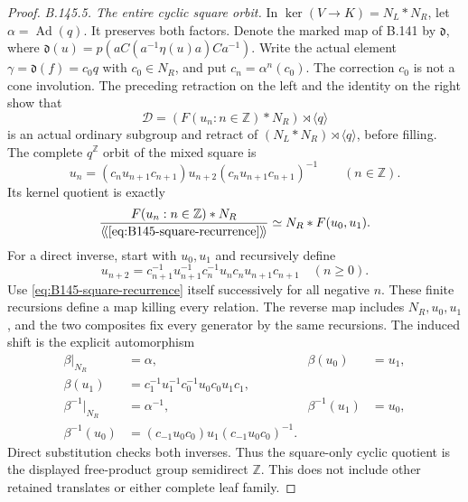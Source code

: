 \begin{proof}
\emph{B.145.5. The entire cyclic square orbit.}
In $\ker(V\to K)=N_L*N_R$, let $\alpha=\operatorname{Ad}(q)$.
It preserves both factors. Denote the marked map of B.141 by
$\mathfrak d$, where
$\mathfrak d(u)=p(aC(a^{-1}\eta(u)a)Ca^{-1})$.
Write the actual element
$\gamma=\mathfrak d(f)=c_0q$ with $c_0\in N_R$, and put
$c_n=\alpha^n(c_0)$. The correction $c_0$ is not a cone involution.
The preceding retraction on the left and the identity on the right
show that
\[
 \mathscr D=(F(u_n:n\in\mathbb Z)*N_R)\rtimes\langle q\rangle
\]
is an actual ordinary subgroup and retract of
$(N_L*N_R)\rtimes\langle q\rangle$, before filling.
The complete $q^{\mathbb Z}$ orbit of the mixed square is
\begin{equation}\label{eq:B145-square-recurrence}
 u_n=(c_nu_{n+1}c_{n+1})u_{n+2}
                  (c_nu_{n+1}c_{n+1})^{-1}
                  \qquad(n\in\mathbb Z).
\end{equation}
Its kernel quotient is exactly
\begin{equation}\label{eq:B145-square-normal}
 \frac{F(u_n:n\in\mathbb Z)*N_R}
 {\langle\!\langle\eqref{eq:B145-square-recurrence}
                  \rangle\!\rangle}
       \simeq N_R*F(u_0,u_1).
\end{equation}
For a direct inverse, start with $u_0,u_1$ and recursively define
\[
 u_{n+2}=c_{n+1}^{-1}u_{n+1}^{-1}c_n^{-1}u_n
                      c_nu_{n+1}c_{n+1}\quad(n\geq0).
\]
Use \eqref{eq:B145-square-recurrence} itself successively for all
negative $n$. These finite recursions define a map killing every
relation. The reverse map includes $N_R,u_0,u_1$, and the two
composites fix every generator by the same recursions.
The induced shift is the explicit automorphism
\begin{equation}\label{eq:B145-beta}
\begin{aligned}
 \beta|_{N_R}&=\alpha,& \beta(u_0)&=u_1,\\
 \beta(u_1)&=c_1^{-1}u_1^{-1}c_0^{-1}u_0c_0u_1c_1,\\
 \beta^{-1}|_{N_R}&=\alpha^{-1},&\beta^{-1}(u_1)&=u_0,\\
 \beta^{-1}(u_0)&=(c_{-1}u_0c_0)u_1(c_{-1}u_0c_0)^{-1}.
\end{aligned}
\end{equation}
Direct substitution checks both inverses. Thus the square-only
cyclic quotient is the displayed free-product group semidirect
$\mathbb Z$. This does not include other retained translates or
either complete leaf family.


\end{proof}
